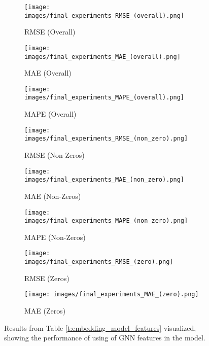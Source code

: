 \documentclass{article}
\begin{document}
\begin{figure}[H]
    \centering
    \begin{subfigure}[b]{0.32\textwidth}
        \texttt{[image: images/final\_experiments\_RMSE\_(overall).png]}
        \caption{RMSE (Overall)}
    \end{subfigure}
    \hfill
    \begin{subfigure}[b]{0.32\textwidth}
        \texttt{[image: images/final\_experiments\_MAE\_(overall).png]}
        \caption{MAE (Overall)}
    \end{subfigure}
    \hfill
    \begin{subfigure}[b]{0.32\textwidth}
        \texttt{[image: images/final\_experiments\_MAPE\_(overall).png]}
        \caption{MAPE (Overall)}
    \end{subfigure}

    \vspace{0.7cm}
    \begin{subfigure}[b]{0.32\textwidth}
        \texttt{[image: images/final\_experiments\_RMSE\_(non\_zero).png]}
        \caption{RMSE (Non-Zeros)}
    \end{subfigure}
    \hfill
    \begin{subfigure}[b]{0.32\textwidth}
        \texttt{[image: images/final\_experiments\_MAE\_(non\_zero).png]}
        \caption{MAE (Non-Zeros)}
    \end{subfigure}
    \hfill
    \begin{subfigure}[b]{0.32\textwidth}
        \texttt{[image: images/final\_experiments\_MAPE\_(non\_zero).png]}
        \caption{MAPE (Non-Zeros)}
    \end{subfigure}

    \vspace{0.7cm}
    \begin{subfigure}[b]{0.30\textwidth}
        \texttt{[image: images/final\_experiments\_RMSE\_(zero).png]}
        \caption{RMSE (Zeros)}
    \end{subfigure}
    \hfill
    \begin{subfigure}[b]{0.30\textwidth}
        \texttt{[image: images/final\_experiments\_MAE\_(zero).png]}
        \caption{MAE (Zeros)}
    \end{subfigure}
    \caption{Results from Table \ref{t:embedding_model_features} visualized, showing the performance of using of GNN features in the model.}
    \label{fig:embedding_model_features}
    \hfill
\end{figure}
\end{document}
